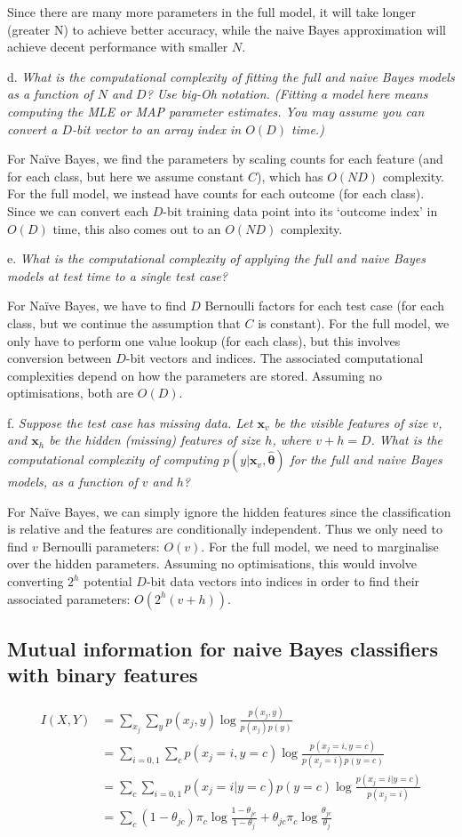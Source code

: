Since there are many more parameters in the full model, it will take longer (greater N) to achieve better accuracy, while the naive Bayes approximation will achieve decent performance with smaller $N$.

d. \textit{What is the computational complexity of fitting the full and naive Bayes models as a function of $N$ and $D$? Use big-Oh notation. (Fitting a model here means computing the MLE or MAP parameter estimates. You may assume you can convert a $D$-bit vector to an array index in $O(D)$ time.)}

For Na\"ive Bayes, we find the parameters by scaling counts for each feature (and for each class, but here we assume constant $C$), which has $O(ND)$ complexity. For the full model, we instead have counts for each outcome (for each class). Since we can convert each $D$-bit training data point into its `outcome index' in $O(D)$ time, this also comes out to an $O(ND)$ complexity.

e. \textit{What is the computational complexity of applying the full and naive Bayes models at test time to a single test case?}

For Na\"ive Bayes, we have to find $D$ Bernoulli factors for each test case (for each class, but we continue the assumption that $C$ is constant). For the full model, we only have to perform one value lookup (for each class), but this involves conversion between $D$-bit vectors and indices. The associated computational complexities depend on how the parameters are stored. Assuming no optimisations, both are $O(D)$.

f. \textit{Suppose the test case has missing data. Let $\bm{x}_v$ be the visible features of size $v$, and $\bm{x}_h$ be the hidden (missing) features of size $h$, where $v+h=D$. What is the computational complexity of computing $p(y|\bm{x}_v,\hat{\bm\theta})$ for the full and naive Bayes models, as a function of $v$ and $h$?}

For Na\"ive Bayes, we can simply ignore the hidden features since the classification is relative and the features are conditionally independent. Thus we only need to find $v$ Bernoulli parameters: $O(v)$. For the full model, we need to marginalise over the hidden parameters. Assuming no optimisations, this would involve converting $2^h$ potential $D$-bit data vectors into indices in order to find their associated parameters: $O(2^h(v+h))$.

\subsection{Mutual information for naive Bayes classifiers with binary features}
\begin{align*}
I(X,Y) &= \sum_{x_j} \sum_y p(x_j,y) \log\frac{p(x_j,y)}{p(x_j)p(y)}\\
&= \sum_{i=0,1} \sum_c p(x_j=i,y=c) \log\frac{p(x_j=i,y=c)}{p(x_j=i)p(y=c)}\\
&= \sum_c \sum_{i=0,1} p(x_j=i|y=c)p(y=c) \log\frac{p(x_j=i|y=c)}{p(x_j=i)}\\
&= \sum_c (1-\theta_{jc}) \pi_c \log\frac{1-\theta_{jc}}{1-\theta_j} + \theta_{jc} \pi_c \log\frac{\theta_{jc}}{\theta_j}
\end{align*}

